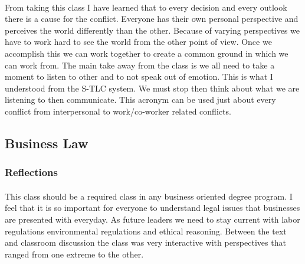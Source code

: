 \documentclass[12pt,titlepage]{article}
\begin{document}
\paragraph {}
From taking this class I have learned that to every decision and every outlook there is a cause for the conflict. Everyone has their own personal perspective and perceives the world differently than the other. Because of varying perspectives we have to work hard to see the world from the other point of view. Once we accomplish this we can work together to create a common ground in which we can work from. The main take away from the class is we all need to take a moment to listen to other and to not speak out of emotion. This is what I understood from the S-TLC system. We must stop then think about what we are listening to then communicate. This acronym can be used just about every conflict from interpersonal to work/co-worker related conflicts.


\restoregeometry





\subsection{Business Law}
\subsubsection{Reflections}
\paragraph {}
This class should be a required class in any business oriented degree program. I feel that it is so important for everyone to understand legal issues that businesses are presented with everyday. As future leaders we need to stay current with labor regulations environmental regulations and ethical reasoning. Between the text and classroom discussion the class was very interactive with perspectives that ranged from one extreme to the other.
\end{document}
